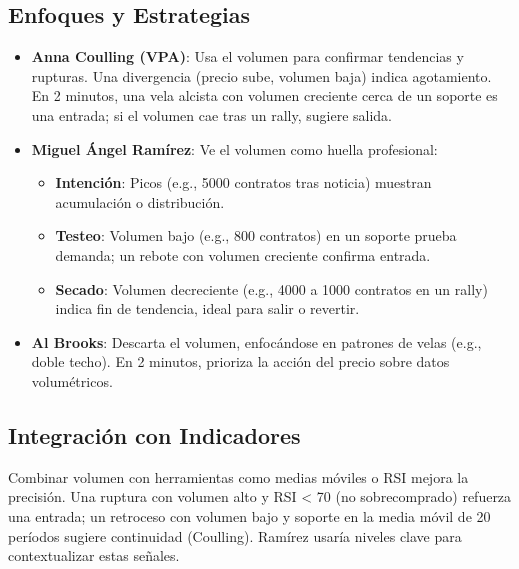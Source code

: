 \subsection{Enfoques y Estrategias}
\begin{itemize}
    \item \textbf{Anna Coulling (VPA)}: Usa el volumen para confirmar tendencias y rupturas. Una divergencia (precio sube, volumen baja) indica agotamiento. En 2 minutos, una vela alcista con volumen creciente cerca de un soporte es una entrada; si el volumen cae tras un rally, sugiere salida.
    \item \textbf{Miguel \'Angel Ram\'irez}: Ve el volumen como huella profesional:
    \begin{itemize}
        \item \textbf{Intenci\'on}: Picos (e.g., 5000 contratos tras noticia) muestran acumulaci\'on o distribuci\'on.
        \item \textbf{Testeo}: Volumen bajo (e.g., 800 contratos) en un soporte prueba demanda; un rebote con volumen creciente confirma entrada.
        \item \textbf{Secado}: Volumen decreciente (e.g., 4000 a 1000 contratos en un rally) indica fin de tendencia, ideal para salir o revertir.
    \end{itemize}
    \item \textbf{Al Brooks}: Descarta el volumen, enfoc\'andose en patrones de velas (e.g., doble techo). En 2 minutos, prioriza la acci\'on del precio sobre datos volum\'etricos.
\end{itemize}

\subsection{Integraci\'on con Indicadores}
Combinar volumen con herramientas como medias m\'oviles o RSI mejora la precisi\'on. Una ruptura con volumen alto y RSI < 70 (no sobrecomprado) refuerza una entrada; un retroceso con volumen bajo y soporte en la media m\'ovil de 20 per\'iodos sugiere continuidad (Coulling). Ram\'irez usaría niveles clave para contextualizar estas se\~nales.


